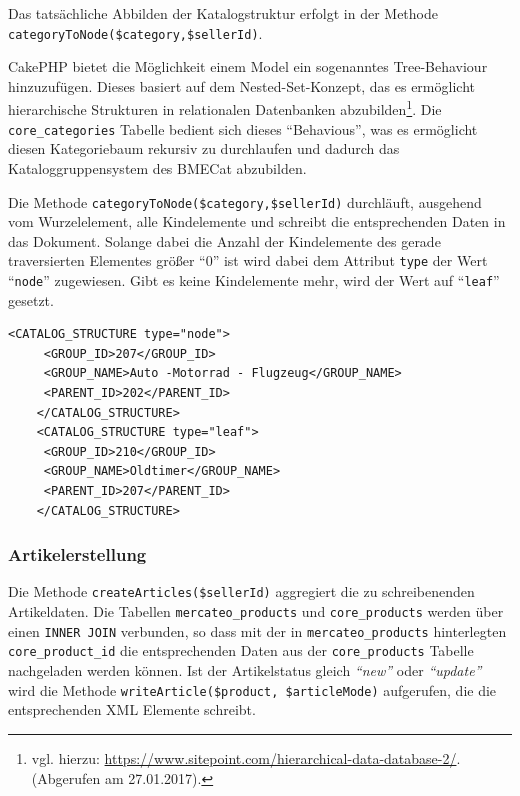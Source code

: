 {	 Das tatsächliche Abbilden der Katalogstruktur erfolgt in der Methode \texttt{categoryToNode(\$category,\-\$sellerId)}.


		 CakePHP bietet die Möglichkeit einem Model ein sogenanntes Tree-Behaviour hinzuzufügen. Dieses basiert auf dem Nested-Set-Konzept, das es ermöglicht hierarchische Strukturen in relationalen Datenbanken abzubilden\footnote{vgl. hierzu: \url{https://www.sitepoint.com/hierarchical-data-database-2/}.(Abgerufen am 27.01.2017).}. Die \texttt{core\_categories} Tabelle bedient sich dieses \enquote{Behavious}, was es ermöglicht diesen Kategoriebaum rekursiv zu durchlaufen und dadurch das Kataloggruppensystem des BMECat abzubilden.

	
	
	Die Methode \texttt{categoryToNode(\$category,\$sellerId)} durchläuft, ausgehend vom Wurzelelement, alle Kindelemente und schreibt die entsprechenden Daten in das Dokument. Solange dabei die Anzahl der Kindelemente des gerade traversierten Elementes größer \enquote{0} ist wird dabei dem Attribut \texttt{type} der Wert \enquote{\texttt{node}} zugewiesen. Gibt es keine Kindelemente mehr, wird der Wert auf \enquote{\texttt{leaf}} gesetzt. 
	\lstset{language=xml}
	\begin{lstlisting}[caption={Abbildung des Kataloggruppensystems}]
	<CATALOG_STRUCTURE type="node">
	 <GROUP_ID>207</GROUP_ID>
	 <GROUP_NAME>Auto -Motorrad - Flugzeug</GROUP_NAME>
	 <PARENT_ID>202</PARENT_ID>
	</CATALOG_STRUCTURE>
	<CATALOG_STRUCTURE type="leaf">
	 <GROUP_ID>210</GROUP_ID>
	 <GROUP_NAME>Oldtimer</GROUP_NAME>
	 <PARENT_ID>207</PARENT_ID>
	</CATALOG_STRUCTURE>
	\end{lstlisting}
	
	\subsubsection{Artikelerstellung}
	
	Die Methode \texttt{createArticles(\$sellerId)} aggregiert die zu schreibenenden Artikeldaten. Die Tabellen \texttt{mercateo\_products} und \texttt{core\_products} werden über einen \texttt{INNER JOIN} verbunden, so dass mit der in \texttt{mercateo\_products} hinterlegten \texttt{core\_product\_id} die entsprechenden Daten aus der \texttt{core\_products} Tabelle nachgeladen werden können. 
	Ist der Artikelstatus gleich \textit{\enquote{new}} oder \textit{\enquote{update}} wird die Methode \texttt{writeArticle(\$product, \$articleMode)} aufgerufen, die die entsprechenden XML Elemente schreibt. \\
		
}
